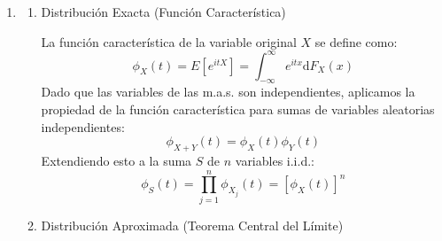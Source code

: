 \begin{enumerate}[label=\color{red}\textbf{\arabic*)}]
\begin{enumerate}[label=\color{red}\textbf{\alph*)}]
		            Para encontrar la distribución de este estadístico, debemos observar la suma del numerador, $N=X_1+X_2+X_3$. Al repetir un experimento con una situación dicotómica $n$ veces, el número de "éxitos"  $N$ sigue una distribución binomial  $\mathcal{B}(n,p)$. Como el tamaño de muestra es $n=3$, tenemos que:  $$N\sim \mathcal{B}(3,p).$$
		            Poder usar esta distribución para hacer cálculos exactos sobre $\hat{p}=\dfrac{N}{n}$. Dado que $\hat{p}=\dfrac{N}{3}$, el estadístico solo puede tomar los valores correspondientes a los posibles resultados de $N$ divididos entre 3  $(0,\tfrac{1}{3} ,\tfrac{2}{3} ,1)$. Su distribución exacta en el muestreo viene dada por las probabilidades de la distribución binomial:
		            \begin{itemize}[label=\textbullet]
			            \item $P(\hat{p}=0)=P(N=0)=\binom{3}{0}p^0(1-p)^3=(1-p)^3$
			            \item $P(\hat{p}=\frac{1}{3})=P(N=1)=\binom{3}{1}p^1(1-p)^2=3p(1-p)^2$
			            \item $P(\hat{p}=\frac{2}{3})=P(N=2)=\dbinom{3}{2} p^2(1-p)^1=3p^2(1-p)$
			            \item $P(\hat{p}=1)=P(N=3)=\dbinom{3}{3} p^3(1-p)^0=p^3$
		            \end{itemize}
	      \end{enumerate}
	\item {}

	      \begin{enumerate}[label=\arabic*)]
		      \item Distribución Exacta (Función Característica)

		            La función característica de la variable original $X$ se define como:  \[
			            \phi_X(t)=E[e^{itX} ]=\int_{-\infty}^{\infty} e^{itx}\mathrm{d}F_X(x)
		            \]
		            Dado que las variables de las m.a.s. son independientes, aplicamos la propiedad de la función característica para sumas de variables aleatorias independientes: \[
			            \phi_{X+Y}(t)=\phi_X(t)\phi_Y(t)
		            \]
		            Extendiendo esto a la suma $S$ de  $n$ variables i.i.d.:  \[
			            \phi_S(t)=\prod_{j=1}^{n} \phi_{X_j}(t)=[\phi_X(t)]^n
		            \]
		      \item Distribución Aproximada (Teorema Central del Límite)


\end{enumerate}
\end{enumerate}
